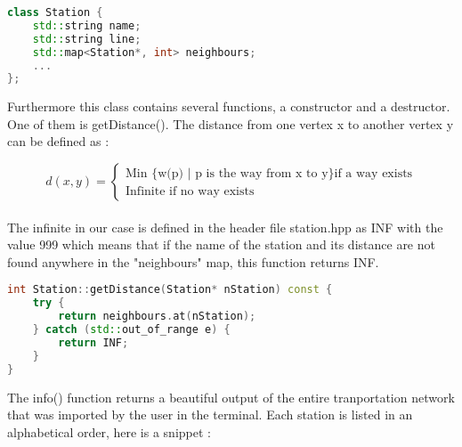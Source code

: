 \documentclass[12pt]{article}
\begin{document}
\begin{lstlisting}[language=C++, caption = class Station(private members)]
class Station {
    std::string name;
    std::string line;
    std::map<Station*, int> neighbours;
    ...
};
\end{lstlisting}

\noindent Furthermore this class contains several functions, a constructor and a destructor.\\
One of them is getDistance(). The distance from one vertex x to another vertex y can be defined as $\colon$
 
 \[d(x,y) =
 \begin{cases} \text{Min \{w(p) $|$ p is the way from x to y\} if a way exists}\\
                 \text{Infinite if no way exists}
\end{cases}
\]
\\
The infinite in our case is defined in the header file station.hpp as INF with the value 999 which means that if the name of the station and its distance are not found anywhere in the "neighbours" map, this function returns INF.

\begin{lstlisting}[language=C++, caption = getDistance()]
int Station::getDistance(Station* nStation) const {
    try {
        return neighbours.at(nStation);
    } catch (std::out_of_range e) {
        return INF;
    }
}
\end{lstlisting}

The info() function returns a beautiful output of the entire tranportation network that was imported by the user in the terminal. Each station is listed in an alphabetical order, here is a snippet $\colon$ \\
\end{document}
